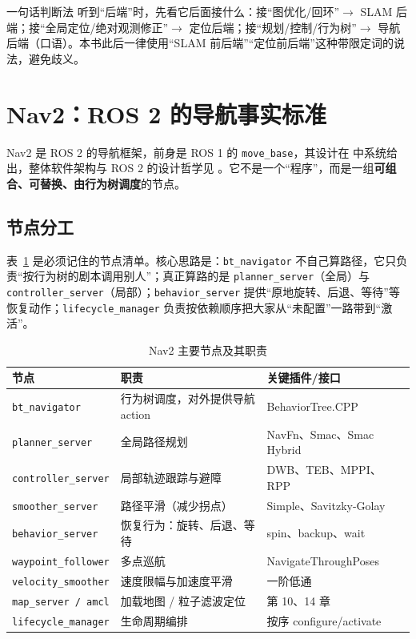\begin{keybox}{一句话判断法}
听到“后端”时，先看它后面接什么：接“图优化/回环”$\rightarrow$ SLAM 后端；接“全局定位/绝对观测修正”$\rightarrow$ 定位后端；接“规划/控制/行为树”$\rightarrow$ 导航后端（口语）。本书此后一律使用“SLAM 前后端”“定位前后端”这种带限定词的说法，避免歧义。
\end{keybox}

\section{Nav2：ROS 2 的导航事实标准}\label{sec:18-nav2}

Nav2 是 ROS 2 的导航框架，前身是 ROS 1 的 \texttt{move\_base}，其设计在 \cite{macenski2020nav2} 中系统给出，整体软件架构与 ROS 2 的设计哲学见 \cite{macenski2022ros2}。它不是一个“程序”，而是一组\textbf{可组合、可替换、由行为树调度}的节点。

\subsection{节点分工}

表~\ref{tab:18-nav2nodes} 是必须记住的节点清单。核心思路是：\texttt{bt\_navigator} 不自己算路径，它只负责“按行为树的剧本调用别人”；真正算路的是 \texttt{planner\_server}（全局）与 \texttt{controller\_server}（局部）；\texttt{behavior\_server} 提供“原地旋转、后退、等待”等恢复动作；\texttt{lifecycle\_manager} 负责按依赖顺序把大家从“未配置”一路带到“激活”。

\begin{table}[htbp]
  \centering
  \caption{Nav2 主要节点及其职责}
  \label{tab:18-nav2nodes}
  \small
  \begin{tabular}{lll}
    \toprule
    节点 & 职责 & 关键插件/接口 \\
    \midrule
    \texttt{bt\_navigator} & 行为树调度，对外提供导航 action & BehaviorTree.CPP \\
    \texttt{planner\_server} & 全局路径规划 & NavFn、Smac、Smac Hybrid \\
    \texttt{controller\_server} & 局部轨迹跟踪与避障 & DWB、TEB、MPPI、RPP \\
    \texttt{smoother\_server} & 路径平滑（减少拐点） & Simple、Savitzky-Golay \\
    \texttt{behavior\_server} & 恢复行为：旋转、后退、等待 & spin、backup、wait \\
    \texttt{waypoint\_follower} & 多点巡航 & NavigateThroughPoses \\
    \texttt{velocity\_smoother} & 速度限幅与加速度平滑 & 一阶低通 \\
    \texttt{map\_server / amcl} & 加载地图 / 粒子滤波定位 & 第 10、14 章 \\
    \texttt{lifecycle\_manager} & 生命周期编排 & 按序 configure/activate \\
    \bottomrule
  \end{tabular}
\end{table}

